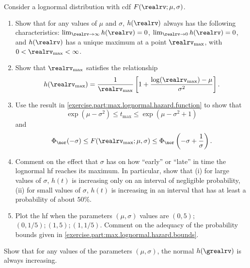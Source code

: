 \begin{exercise1}
\label{exercise:lognormal.hazard}
Consider a lognormal distribution with cdf $F(\realrv;\mu,\sigma)$.
\begin{enumerate}
\item     
Show that for any values of $\mu$ and $\sigma$, $h(\realrv)$ always
has the following characteristics: $\lim_{\realrv
\rightarrow \infty}h(\realrv)=0$, $\lim_{\realrv
\rightarrow 0}h(\realrv)=0$, and $h(\realrv)$ has a
unique maximum at a point $\realrv_{\max}$, with $0 <
\realrv_{\max} < \infty$.
\item
\label{exercise.part:max.lognormal.hazard.function} 
Show that $\realrv_{\max}$ satisfies the relationship
\begin{displaymath}
h(\realrv_{\max})=\frac{1}{\realrv_{\max}} \left [
1+\frac{\log(\realrv_{\max})-\mu}{\sigma^{2}} \right ].
\end{displaymath}
\item 
\label{exercise.part:max.lognormal.hazard.bounds} 
Use the result in 
\ref{exercise.part:max.lognormal.hazard.function} to show that
\begin{displaymath} 	 
\exp(\mu-\sigma^{2}) \leq
t_{\max} \leq \exp(\mu-\sigma^{2}+1)
\end{displaymath} 	 
and
\begin{displaymath} 		
\Phi_{\nor}(-\sigma) \leq
F(\realrv_{\max};\mu, \sigma) \leq \Phi_{\nor} \left
(-\sigma+\frac{1}{\sigma} \right ).
\end{displaymath}
\item
Comment on the effect that $\sigma$ has on how ``early'' or ``late''
in time the lognormal hf reaches its maximum. In particular, show
that (i) for large values of $\sigma$, $h(t)$ is increasing only on
an interval of negligible probability, (ii) for small values of
$\sigma$, $h(t)$ is increasing in an interval that has at least a
probability of about $50\%$.
\item 
Plot the hf when the parameters $(\mu,
\sigma)$ values are $(0, 5);$ $ (0, 1/5); (1, 5); (1, 1/5)$.
Comment on the adequacy of the probability bounds given in 
\ref{exercise.part:max.lognormal.hazard.bounds}.
\end{enumerate}
\end{exercise1}

\begin{exercise1}
Show that for any values of the parameters $(\mu, \sigma)$,
      the normal $h(\grealrv)$
      is always increasing.
\end{exercise1}



